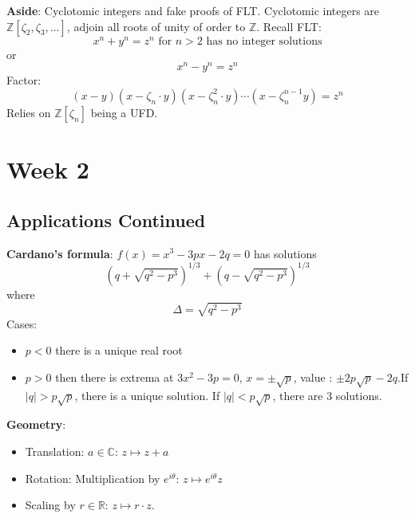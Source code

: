 \documentclass{report}
\begin{document}
\textbf{Aside}: Cyclotomic integers and fake proofs of FLT. Cyclotomic integers are $\mathbb{Z}[\zeta_{2}, \zeta_{3}, \ldots]$, adjoin all roots of unity of order to $\mathbb{Z}$. Recall FLT:
    \begin{equation*}
        x^{n} + y^{n} = z^{n} \text{ for $n > 2$ has no integer solutions}
    \end{equation*}
or
    \begin{equation*}
        x^{n} - y^{n} = z^{n}
    \end{equation*}
Factor:
    \begin{equation*}
        (x - y)(x - \zeta_{n} \cdot y)(x - \zeta_{n}^{2} \cdot y) \cdots (x - \zeta_{n}^{n - 1}y) = z^{n}
    \end{equation*}
Relies on $\mathbb{Z}[\zeta_{n}]$ being a UFD.

\chapter{Week 2}

\begin{topic}
    \section{Applications Continued}
\end{topic}

\textbf{Cardano's formula}: $f(x) = x^{3} - 3px - 2q = 0$ has solutions 
    \begin{equation*}
        (q + \sqrt{q^{2} - p^{3}})^{1/3} + (q - \sqrt{q^{2} - p^{3}})^{1/3}
    \end{equation*}
where 
    \begin{equation*}
        \Delta = \sqrt{q^{2} - p^{3}}
    \end{equation*}
Cases:
    \begin{itemize}
        \item $p < 0$ there is a unique real root

        \item $p > 0$ then there is extrema at $3x^{2} - 3p = 0$, $x = \pm \sqrt{p}$, value : $\pm 2p\sqrt{p} - 2q$.If $\lvert q \rvert > p \sqrt{p}$, there is a unique solution. If $\lvert q \rvert < p \sqrt{p}$, there are $3$ solutions.
    \end{itemize}

\textbf{Geometry}: 
    \begin{itemize}
        \item Translation: $a \in \mathbb{C}$: $z \mapsto z + a$

        \item Rotation: Multiplication by $e^{i \theta}$: $z \mapsto e^{i \theta}z$

        \item Scaling by $r \in \mathbb{R}$: $z \mapsto r \cdot z$. 
    \end{itemize}
\end{document}
